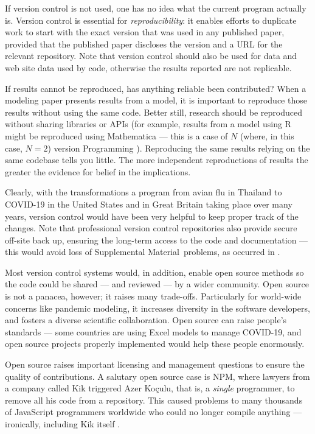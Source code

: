 \documentclass{article}
\def\supplement{Supplemental Material}
\begin{document}
If version control is not used, one has no idea what the current program actually is. {Version control is essential for \emph{reproducibility\/}: \cite{basic-reproducibilty,reproducibility} it enables efforts to duplicate work to start with the exact version that was used in any published paper, provided that the published paper discloses the version and a URL for the relevant repository. Note that version control should also be used for data and web site data used by code, otherwise the results reported are not replicable.}

{If results cannot be reproduced, has anything reliable been contributed? When a modeling paper presents results from a model, it is important to reproduce those results without using the same code. Better still, research should be reproduced without sharing libraries or APIs (for example, results from a model using R might be reproduced using Mathematica --- this is a case of $N$ (where, in this case, $N=2$) version Programming \cite{NVP}). Reproducing the same results relying on the same codebase tells you little. The more independent reproductions of results the greater the evidence for belief in the implications.}

Clearly, with the transformations a program from avian flu in Thailand \cite{avianFluModel} to COVID-19 in the United States and in Great Britain \cite{ICmodel} taking place over many years, version control would have been very helpful to keep proper track of the changes. Note that professional version control repositories also provide secure off-site back up, ensuring the long-term access to the code and documentation --- this would avoid loss of \supplement\ problems, as occurred in \cite{flu-model}.

Most version control systems would, in addition, enable open source methods so the code could be shared --- and reviewed --- by a wider community. Open source is not a panacea, however; it raises many trade-offs. Particularly for world-wide concerns like pandemic modeling, it increases diversity in the software developers, and fosters a diverse scientific collaboration. Open source can raise people's standards --- some countries \cite{excel1,excel2} are using Excel models to manage COVID-19, and open source projects properly implemented would help these people enormously. 

Open source raises important licensing and management questions to ensure the quality of contributions. A salutary open source case is NPM, where lawyers from a company called Kik triggered Azer Ko\c{c}ulu, that is, a \emph{single\/} programmer, to remove all his code from a repository. This caused problems to many thousands of JavaScript programmers worldwide who could no longer compile anything --- ironically, including Kik itself \cite{npm}. 
\end{document}
